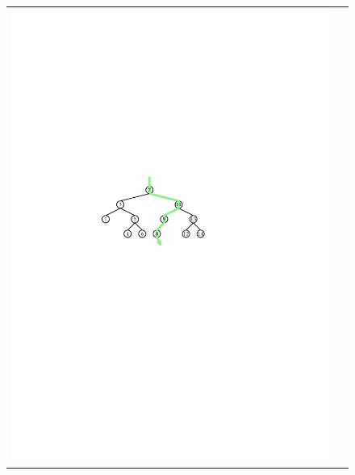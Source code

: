 \begin{figure}
  \begin{center}
    \begin{tabular}{cc}
    \includegraphics[width=\HalfScaleIfNeeded]{figs/bst-example-4} &

\end{tabular}
\end{center}
\end{figure}
